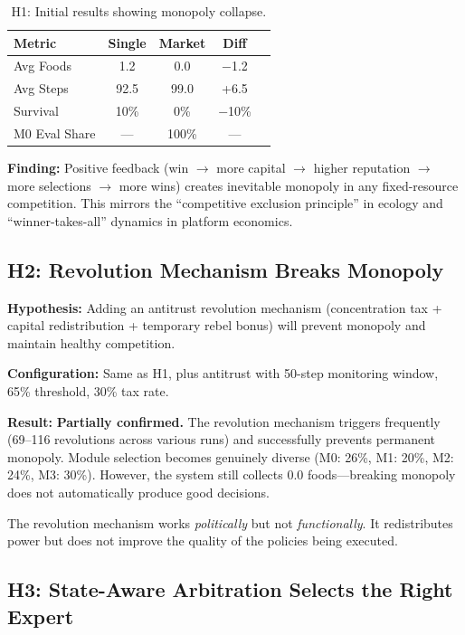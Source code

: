 \documentclass[a4paper,11pt]{article}
\begin{document}
\begin{table}[H]
\centering
\caption{H1: Initial results showing monopoly collapse.}
\label{tab:h1}
\begin{tabular}{lcccc}
\toprule
\textbf{Metric} & \textbf{Single} & \textbf{Market} & \textbf{Diff} \\
\midrule
Avg Foods  & 1.2 & 0.0 & $-$1.2 \\
Avg Steps  & 92.5 & 99.0 & +6.5 \\
Survival   & 10\% & 0\%  & $-$10\% \\
M0 Eval Share & ---  & 100\% & --- \\
\bottomrule
\end{tabular}
\end{table}

\textbf{Finding:} Positive feedback (win $\rightarrow$ more capital $\rightarrow$ higher reputation $\rightarrow$ more selections $\rightarrow$ more wins) creates inevitable monopoly in any fixed-resource competition. This mirrors the ``competitive exclusion principle'' in ecology and ``winner-takes-all'' dynamics in platform economics.

\subsection{H2: Revolution Mechanism Breaks Monopoly}

\textbf{Hypothesis:} Adding an antitrust revolution mechanism (concentration tax + capital redistribution + temporary rebel bonus) will prevent monopoly and maintain healthy competition.

\textbf{Configuration:} Same as H1, plus antitrust with 50-step monitoring window, 65\% threshold, 30\% tax rate.

\textbf{Result:} \textbf{Partially confirmed.} The revolution mechanism triggers frequently (69--116 revolutions across various runs) and successfully prevents permanent monopoly. Module selection becomes genuinely diverse (M0: 26\%, M1: 20\%, M2: 24\%, M3: 30\%). However, the system still collects 0.0 foods---breaking monopoly does not automatically produce good decisions.

The revolution mechanism works \textit{politically} but not \textit{functionally}. It redistributes power but does not improve the quality of the policies being executed.

\subsection{H3: State-Aware Arbitration Selects the Right Expert}
\end{document}

